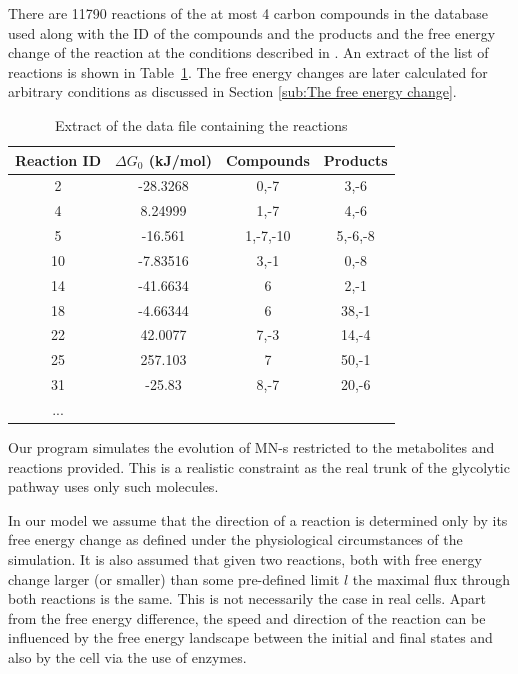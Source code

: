 \documentclass[a4paper,12pt]{article}
\begin{document}
	There are 11790 reactions of the at most 4 carbon compounds in the database used along with the ID of the compounds and the products and the free energy change of the reaction at the conditions described in \cite{BartekLower}. An extract of the list of reactions is shown in Table~\ref{tab:reacs}. The free energy changes are later calculated for arbitrary conditions as discussed in Section \ref{sub:The free energy change}.

	\begin{table}[htpb]
		\centering
		\begin{tabular}{cccc}
		Reaction ID &	$\Delta G_0$ (kJ/mol) & Compounds & Products \\ \hline
		2 &	-28.3268      & 0,-7   & 3,-6   \\
		4 &	8.24999      & 1,-7   & 4,-6   \\
		5 &	-16.561      & 1,-7,-10 & 5,-6,-8 \\
		10 &	-7.83516      & 3,-1   & 0,-8   \\
		14 &	-41.6634      & 6     & 2,-1   \\
		18 &	-4.66344      & 6     & 38,-1  \\
		22 &	42.0077      & 7,-3   & 14,-4  \\
		25 &	257.103      & 7     & 50,-1  \\
		31 &	-25.83       & 8,-7   & 20,-6  \\
		...&      &     
		\end{tabular}
		\caption{Extract of the data file containing the reactions}
		\label{tab:reacs}
	\end{table}
	
	Our program simulates the evolution of MN-s restricted to the metabolites and reactions provided. This is a realistic constraint as the real trunk of the glycolytic pathway uses only such molecules.

	In our model we assume that the direction of a reaction is determined only by its free energy change as defined under the physiological circumstances of the simulation. It is also assumed that given two reactions, both with free energy change larger (or smaller) than some pre-defined limit $l$ the maximal flux through both reactions is the same. This is not necessarily the case in real cells. Apart from the free energy difference, the speed and direction of the reaction can be influenced by the free energy landscape between the initial and final states and also by the cell via the use of enzymes. 
\end{document}
